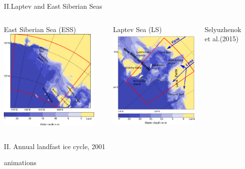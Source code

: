 \documentclass[8pt]{beamer}
\newcommand\Fontvi{\fontsize{6}{7.2}\selectfont}
\begin{document}
\setwatermark{\fontsize{125pt}{125pt}\selectfont{}}
\begin{frame}[fragile]{II.Laptev and East Siberian Seas}
	
	\begin{columns}
			\begin{center}
				East Siberian Sea (ESS)
				\includegraphics[height=5cm]{./img/ESSBath.pdf}
			\end{center}
			\begin{center}
				Laptev Sea (LS)
				\includegraphics[height=5cm]{./img/LaptevBath.png}
			\end{center}	
			\begin{flushright}
				\Fontvi
				Selyuzhenok et al.(2015)
			\end{flushright}
	\end{columns}
	
\end{frame}

\setwatermark{\fontsize{125pt}{125pt}\selectfont{}}
\begin{frame}[fragile]{II. Annual landfast ice cycle, 2001}

animations

\end{frame}
\end{document}
